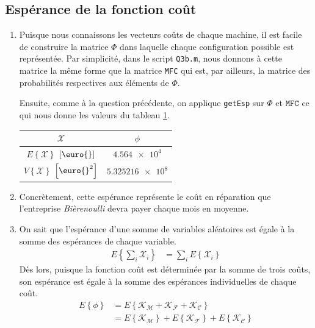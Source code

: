 \documentclass[a4paper, 12pt]{article}
\newcommand{\X}{\mathcal{X}}
\newcommand{\M}{\mathcal{M}}
\newcommand{\F}{\mathcal{F}}
\newcommand{\C}{\mathcal{C}}
\begin{document}
\subsection{Espérance de la fonction coût}
\begin{enumerate}[label=\roman*.]
	\item Puisque nous connaissons les vecteurs coûts de chaque machine, il est facile de construire la matrice $\Phi$ dans laquelle chaque configuration possible est représentée. Par simplicité, dans le script \texttt{Q3b.m}, nous donnons à cette matrice la même forme que la matrice \texttt{MFC} qui est, par ailleurs, la matrice des probabilités respectives aux éléments de $\Phi$. \par
	Ensuite, comme à la question précédente, on applique \texttt{getEsp} sur $\Phi$ et $\texttt{MFC}$ ce qui nous donne les valeurs du tableau \ref{table:Q3b}.
	\begin{table}[H]
		\centering
		\begin{tabular}{|c|c|}
			\hline
			                         $\X$                          &       $\phi$       \\ \hline
			 $E\left\{\X\right\}$ $\left[\textrm{\euro{}}\right]$  &  $\num{4.564e4}$   \\ \hline
			$V\left\{\X\right\}$ $\left[\textrm{\euro{}}^2\right]$ & $\num{5.325216e8}$ \\ \hline
		\end{tabular}
		\label{table:Q3b}
	\end{table}
	\item Concrètement, cette espérance représente le coût en réparation que l'entreprise \textit{Bièrenoulli} devra payer chaque mois en moyenne.
	\item On sait que l'espérance d'une somme de variables aléatoires est égale à la somme des espérances de chaque variable.
	\begin{align}
		E\left\{\sum_{i} \X_i\right\} & = \sum_{i} E\left\{\X_i\right\}
	\end{align}
	Dès lors, puisque la fonction coût est déterminée par la somme de trois coûts, son espérance est égale à la somme des espérances individuelles de chaque coût.
	\begin{align*}
		E\left\{\phi\right\} & = E\left\{\mathcal{K}_\M + \mathcal{K}_\F + \mathcal{K}_\C\right\}                                 \\
		                     & = E\left\{\mathcal{K}_\M\right\} + E\left\{\mathcal{K}_\F\right\} + E\left\{\mathcal{K}_\C\right\}

\end{align*}
\end{enumerate}
\end{document}
